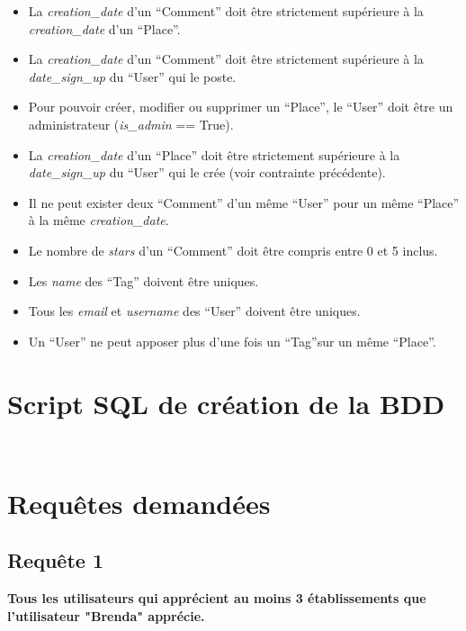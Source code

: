 \documentclass[a4paper,10pt]{article}
\begin{document}
\begin{itemize}
  \item La \emph{creation\_date} d'un ``Comment'' doit être strictement supérieure à la \emph{creation\_date} d'un ``Place''.
  \item La \emph{creation\_date} d'un ``Comment'' doit être strictement supérieure à la \emph{date\_sign\_up} du ``User'' qui le poste.
  \item Pour pouvoir créer, modifier ou supprimer un ``Place'', le ``User'' doit être un administrateur (\emph{is\_admin} == True).
  \item La \emph{creation\_date} d'un ``Place'' doit être strictement supérieure à la \emph{date\_sign\_up}
  du ``User'' qui le crée (voir contrainte précédente).
  \item Il ne peut exister deux ``Comment'' d'un même ``User'' pour un même ``Place'' à la même \emph{creation\_date}.
  \item Le nombre de \emph{stars} d'un ``Comment'' doit être compris entre 0 et 5 inclus.
  \item Les \emph{name} des ``Tag'' doivent être uniques.
  \item Tous les \emph{email} et \emph{username} des ``User'' doivent être uniques.
  \item Un ``User'' ne peut apposer plus d'une fois un ``Tag''sur un même ``Place''.
\end{itemize}

\newpage

\section{Script SQL de création de la BDD}

\inputminted[bgcolor=black,firstline=1,lastline=50]{sql}{./../src/creation.sql}
\newpage
\inputminted[bgcolor=black,firstline=51]{sql}{./../src/creation.sql}
\newpage

\section{Requêtes demandées}

\subsection{Requête 1}

\textbf{Tous les utilisateurs qui apprécient au moins 3 établissements que l’utilisateur "Brenda" apprécie.}
\end{document}
